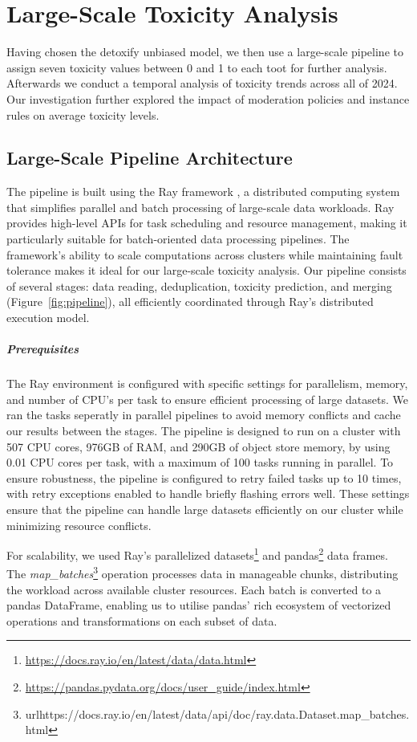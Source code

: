 \chapter{Large-Scale Toxicity Analysis} \label{large-scale-analysis}
Having chosen the detoxify unbiased model, we then use a large-scale pipeline to assign seven toxicity values between 0 and 1 to each toot for further analysis. Afterwards we conduct a temporal analysis of toxicity trends across all of 2024. Our investigation further explored the impact of moderation policies and instance rules on average toxicity levels.

\section{Large-Scale Pipeline Architecture}
The pipeline is built using the Ray framework \cite{moritz:2018}, a distributed computing system that simplifies parallel and batch processing of large-scale data workloads. Ray provides high-level APIs for task scheduling and resource management, making it particularly suitable for batch-oriented data processing pipelines. The framework's ability to scale computations across clusters while maintaining fault tolerance makes it ideal for our large-scale toxicity analysis. Our pipeline consists of several stages: data reading, deduplication, toxicity prediction, and merging (Figure~\ref{fig:pipeline}), all efficiently coordinated through Ray's distributed execution model.

\paragraph{Prerequisites}
The Ray environment is configured with specific settings for parallelism, memory, and number of CPU's per task to ensure efficient processing of large datasets. We ran the tasks seperatly in parallel pipelines to avoid memory conflicts and cache our results between the stages. The pipeline is designed to run on a cluster with 507 CPU cores, 976GB of RAM, and 290GB of object store memory, by using 0.01 CPU cores per task, with a maximum of 100 tasks running in parallel. To ensure robustness, the pipeline is configured to retry failed tasks up to 10 times, with retry exceptions enabled to handle briefly flashing errors well. These settings ensure that the pipeline can handle large datasets efficiently on our cluster while minimizing resource conflicts.

For scalability, we used Ray's parallelized datasets\footnote{\url{https://docs.ray.io/en/latest/data/data.html}} and pandas\footnote{\url{https://pandas.pydata.org/docs/user\_guide/index.html}} data frames. The \textit{map\_batches}\footnote{url{https://docs.ray.io/en/latest/data/api/doc/ray.data.Dataset.map\_batches.html}} operation processes data in manageable chunks, distributing the workload across available cluster resources. Each batch is converted to a pandas DataFrame, enabling us to utilise pandas' rich ecosystem of vectorized operations and transformations on each subset of data.

